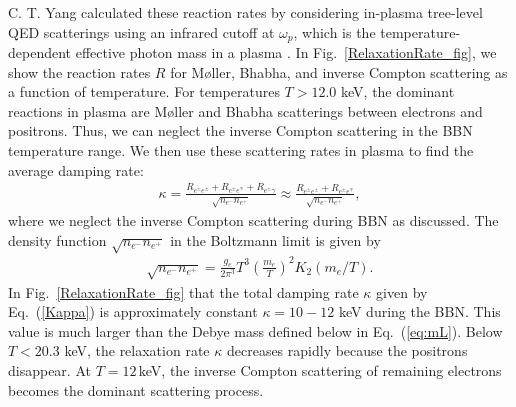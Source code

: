 C. T. Yang calculated these reaction rates by considering in-plasma tree-level QED scatterings using an infrared cutoff at $\omega_p$, which is the temperature-dependent effective photon mass in a plasma \cite{Yang:2024ret}.
In Fig.~\ref{RelaxationRate_fig}, we show the reaction rates $R$ for M{\o}ller, Bhabha, and inverse Compton scattering as a function of temperature. For temperatures $T>12.0$ keV, the dominant reactions in plasma are M{\o}ller and Bhabha scatterings between electrons and positrons. Thus, we can neglect the inverse Compton scattering in the BBN temperature range.
We then use these scattering rates in plasma to find the average damping rate:
\begin{align}\label{Kappa}
\kappa=\frac{R_{e^\pm e^\pm}+R_{e^\pm e^\mp}+R_{e^\pm\gamma}}{\sqrt{n_{e^-}n_{e^+}}}\approx\frac{R_{e^\pm e^\pm}+R_{e^\pm e^\mp}}{\sqrt{n_{e^-}n_{e^+}}},
\end{align}
where we neglect the inverse Compton scattering during BBN as discussed. The density function ${\sqrt{n_{e^-}n_{e^+}}}$ in the Boltzmann limit is given by
\begin{align}
{\sqrt{n_{e^-}n_{e^+}}}=\frac{g_e}{2\pi^3}T^3\left(\frac{m_e}{T}\right)^2K_2(m_e/T).
\end{align}
In Fig.~\ref{RelaxationRate_fig} that the total damping rate $\kappa$ given by Eq.~(\ref{Kappa}) is approximately constant $\kappa=10-12$ keV during the BBN. This value is much larger than the Debye mass defined below in Eq.~(\ref{eq:mL}). Below $T<20.3$ keV, the relaxation rate $\kappa$ decreases rapidly because the positrons disappear. At $T=12$\,keV, the inverse Compton scattering of remaining electrons becomes the dominant scattering process. 

